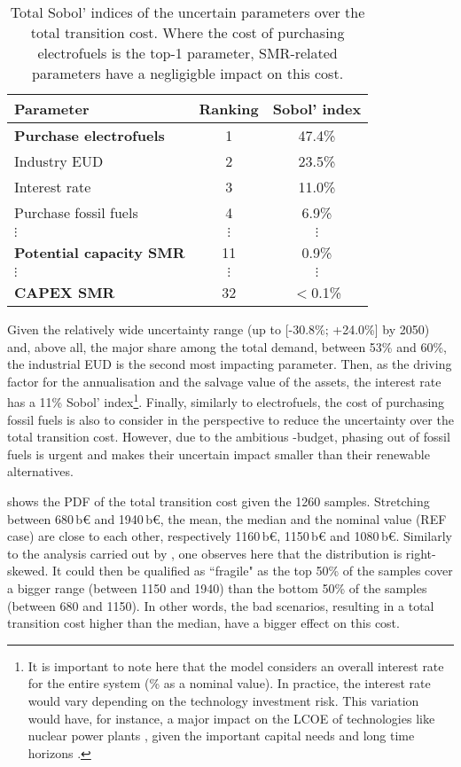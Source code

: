 \begin{table}[htbp!]
\caption{Total Sobol' indices of the uncertain parameters over the total transition cost. Where the cost of purchasing electrofuels is the top-1 parameter, \gls{SMR}-related parameters have a negligigble impact on this cost.}
\label{tab:UQ_short}
\centering
\begin{tabular}{l c c}
\toprule
\textbf{Parameter}  & \textbf{Ranking} & \textbf{Sobol' index} \\	
\midrule
\textbf{Purchase electrofuels} & 1 & 47.4\% \\
Industry EUD & 2 & 23.5\% \\
Interest rate & 3 & 11.0\% \\
Purchase fossil fuels  & 4 & 6.9\% \\
$\vdots$ & $\vdots$ & $\vdots$\\
\textbf{Potential capacity \gls{SMR}} & 11 & 0.9\% \\
$\vdots$ & $\vdots$ & $\vdots$\\
\textbf{CAPEX \gls{SMR}} & 32 & $<$0.1\% \\
\bottomrule							

\end{tabular}
\end{table}

Given the relatively wide uncertainty range (\ie up to [-30.8\%; +24.0\%] by 2050) and, above all, the major share among the total demand, between 53\% and 60\%, the industrial \gls{EUD} is the second most impacting parameter. Then, as the driving factor for the annualisation and the salvage value of the assets, the interest rate has a 11\% Sobol' index\footnote{It is important to note here that the model considers an overall interest rate for the entire system (\% as a nominal value). In practice, the interest rate would vary depending on the technology investment risk. This variation would have, for instance, a major impact on the \gls{LCOE} of technologies like nuclear power plants \cite{world_nuclear_asso}, given the important capital needs and long time horizons \cite{IEA_Nuclear_2022}.}. Finally, similarly to electrofuels, the cost of purchasing fossil fuels is also to consider in the perspective to reduce the uncertainty over the total transition cost. However, due to the ambitious -budget, phasing out of fossil fuels is urgent and makes their uncertain impact smaller than their renewable alternatives.

 shows the \gls{PDF} of the total transition cost given the 1260 samples. Stretching between 680\,b€ and 1940\,b€, the mean, the median and the nominal value (\ie REF case) are close to each other, respectively 1160\,b€, 1150\,b€ and 1080\,b€. Similarly to the analysis carried out by \citet{coppitters2023optimizing}, one observes here that the distribution is right-skewed. It could then be qualified as ``fragile" as the top 50\% of the samples cover a bigger range (\ie between 1150 and 1940) than the bottom 50\% of the samples (\ie between 680 and 1150). In other words, the bad scenarios, resulting in a total transition cost higher than the median, have a bigger effect on this cost.

